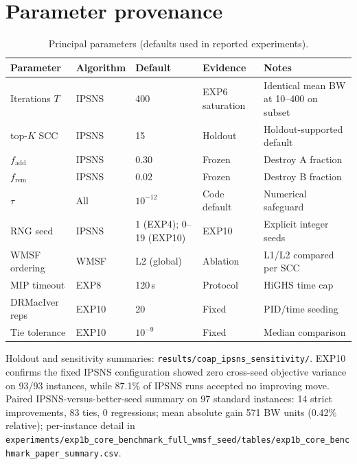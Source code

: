 \section{Parameter provenance}
\label{sec:or1-params}

\begin{table}[h]
\centering\footnotesize
\caption{Principal parameters (defaults used in reported experiments).}
\begin{tabular}{llllp{3.5cm}}
\toprule
Parameter & Algorithm & Default & Evidence & Notes \\
\midrule
Iterations $T$ & IPSNS & 400 & EXP6 saturation & Identical mean BW at 10--400 on subset \\
top-$K$ SCC & IPSNS & 15 & Holdout & Holdout-supported default \\
$f_{\mathrm{add}}$ & IPSNS & 0.30 & Frozen & Destroy A fraction \\
$f_{\mathrm{rem}}$ & IPSNS & 0.02 & Frozen & Destroy B fraction \\
$\tau$ & All & $10^{-12}$ & Code default & Numerical safeguard \\
RNG seed & IPSNS & 1 (EXP4); 0--19 (EXP10) & EXP10 & Explicit integer seeds \\
WMSF ordering & WMSF & L2 (global) & Ablation & L1/L2 compared per SCC \\
MIP timeout & EXP8 & 120\,s & Protocol & HiGHS time cap \\
DRMacIver reps & EXP10 & 20 & Fixed & PID/time seeding \\
Tie tolerance & EXP10 & $10^{-9}$ & Fixed & Median comparison \\
\bottomrule
\end{tabular}
\end{table}

Holdout and sensitivity summaries: \texttt{results/coap\_ipsns\_sensitivity/}. EXP10 confirms the fixed IPSNS configuration showed zero cross-seed objective variance on 93/93 instances, while 87.1\% of IPSNS runs accepted no improving move. Paired IPSNS-versus-better-seed summary on 97 standard instances: 14 strict improvements, 83 ties, 0 regressions; mean absolute gain 571 BW units (0.42\% relative); per-instance detail in \texttt{experiments/exp1b\_core\_benchmark\_full\_wmsf\_seed/tables/exp1b\_core\_benchmark\_paper\_summary.csv}.
